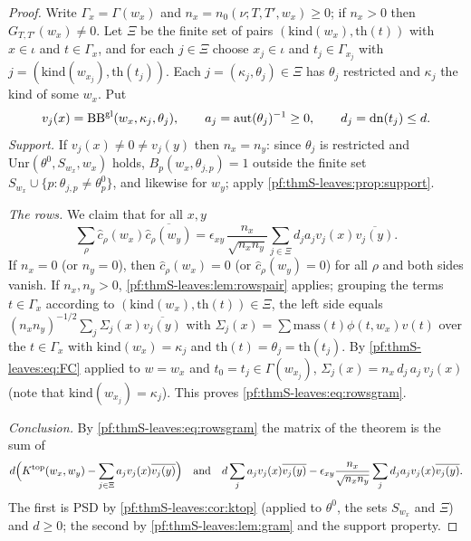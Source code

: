 \begin{proof}
Write $\Gamma_x=\Gamma(w_x)$ and $n_x=n_0(\nu;T,T',w_x)\ge0$; if $n_x>0$ then $G_{T,T'}(w_x)\ne0$. Let $\Xi$ be the finite set of
pairs $(\mathrm{kind}(w_x),\mathrm{th}(t))$ with $x\in\iota$ and $t\in\Gamma_x$, and for each $j\in\Xi$ choose $x_j\in\iota$ and
$t_j\in\Gamma_{x_j}$ with $j=(\mathrm{kind}(w_{x_j}),\mathrm{th}(t_j))$. Each $j=(\kappa_j,\theta_j)\in\Xi$ has $\theta_j$ restricted
and $\kappa_j$ the kind of some $w_x$. Put
\[
v_j(x)=\mathrm{BB}^{\mathrm{gl}}(w_x,\kappa_j,\theta_j),\qquad a_j=\mathrm{aut}(\theta_j)^{-1}\ge0,\qquad d_j=\mathrm{dn}(t_j)\le d.
\]
\emph{Support.} If $v_j(x)\ne0\ne v_j(y)$ then $n_x=n_y$: since $\theta_j$ is restricted and $\mathrm{Unr}(\theta^0,S_{w_x},w_x)$
holds, $B_p(w_x,\theta_{j,p})=1$ outside the finite set $S_{w_x}\cup\{p:\theta_{j,p}\ne\theta^0_p\}$, and likewise for $w_y$; apply
\cref{pf:thmS-leaves:prop:support}.

\emph{The rows.} We claim that for all $x,y$
\begin{equation}\label{pf:thmS-leaves:eq:rowsgram}
\sum_\rho\hat c_\rho(w_x)\overline{\hat c_\rho(w_y)}=\epsilon_{xy}\,\frac{n_x}{\sqrt{n_xn_y}}\sum_{j\in\Xi}d_ja_jv_j(x)\overline{v_j(y)} .
\end{equation}
If $n_x=0$ (or $n_y=0$), then $\hat c_\rho(w_x)=0$ (or $\hat c_\rho(w_y)=0$) for all $\rho$ and both sides vanish. If
$n_x,n_y>0$, \cref{pf:thmS-leaves:lem:rowspair} applies; grouping the terms $t\in\Gamma_x$ according to
$(\mathrm{kind}(w_x),\mathrm{th}(t))\in\Xi$, the left side equals $(n_xn_y)^{-1/2}\sum_{j}\Sigma_j(x)\overline{v_j(y)}$ with
$\Sigma_j(x)=\sum\mathrm{mass}(t)\phi(t,w_x)v(t)$ over the $t\in\Gamma_x$ with $\mathrm{kind}(w_x)=\kappa_j$ and
$\mathrm{th}(t)=\theta_j=\mathrm{th}(t_j)$. By \eqref{pf:thmS-leaves:eq:FC} applied to $w=w_x$ and $t_0=t_j\in\Gamma(w_{x_j})$,
$\Sigma_j(x)=n_x\,d_j\,a_j\,v_j(x)$ (note that $\mathrm{kind}(w_{x_j})=\kappa_j$). This proves \eqref{pf:thmS-leaves:eq:rowsgram}.

\emph{Conclusion.} By \eqref{pf:thmS-leaves:eq:rowsgram} the matrix of the theorem is the sum of
\[
d\Bigl(K^{\mathrm{top}}(w_x,w_y)-\sum_{j\in\Xi}a_jv_j(x)\overline{v_j(y)}\Bigr)\quad\text{and}\quad
d\sum_ja_jv_j(x)\overline{v_j(y)}-\epsilon_{xy}\frac{n_x}{\sqrt{n_xn_y}}\sum_jd_ja_jv_j(x)\overline{v_j(y)} .
\]
The first is PSD by \cref{pf:thmS-leaves:cor:ktop} (applied to $\theta^0$, the sets $S_{w_x}$ and $\Xi$) and $d\ge0$; the second
by \cref{pf:thmS-leaves:lem:gram} and the support property.
\end{proof}


